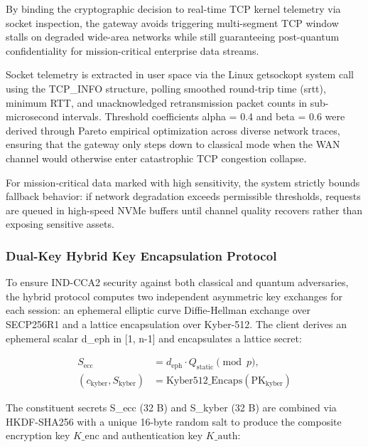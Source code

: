 \documentclass[5p,times]{elsarticle}
\begin{document}
By binding the cryptographic decision to real-time TCP kernel telemetry via socket inspection, the gateway avoids triggering multi-segment TCP window stalls on degraded wide-area networks while still guaranteeing post-quantum confidentiality for mission-critical enterprise data streams.

Socket telemetry is extracted in user space via the Linux getsockopt system call using the TCP\_INFO structure, polling smoothed round-trip time (srtt), minimum RTT, and unacknowledged retransmission packet counts in sub-microsecond intervals. Threshold coefficients alpha = 0.4 and beta = 0.6 were derived through Pareto empirical optimization across diverse network traces, ensuring that the gateway only steps down to classical mode when the WAN channel would otherwise enter catastrophic TCP congestion collapse.

For mission-critical data marked with high sensitivity, the system strictly bounds fallback behavior: if network degradation exceeds permissible thresholds, requests are queued in high-speed NVMe buffers until channel quality recovers rather than exposing sensitive assets.


\subsubsection{Dual-Key Hybrid Key Encapsulation Protocol}

To ensure IND-CCA2 security against both classical and quantum adversaries, the hybrid protocol computes two independent asymmetric key exchanges for each session: an ephemeral elliptic curve Diffie-Hellman exchange over SECP256R1 and a lattice encapsulation over Kyber-512. The client derives an ephemeral scalar d\_eph in [1, n-1] and encapsulates a lattice secret:

\begin{equation}
\begin{aligned}
  S_{\text{ecc}} &= d_{\text{eph}} \cdot Q_{\text{static}} \pmod{p}, \\
  (c_{\text{kyber}}, S_{\text{kyber}}) &= \text{Kyber512\_Encaps}(\text{PK}_{\text{kyber}})
\end{aligned}
\end{equation}

The constituent secrets S\_ecc (32 B) and S\_kyber (32 B) are combined via HKDF-SHA256 with a unique 16-byte random salt to produce the composite encryption key $K\_{\text{enc}}$ and authentication key $K\_{\text{auth}}$:
\end{document}
